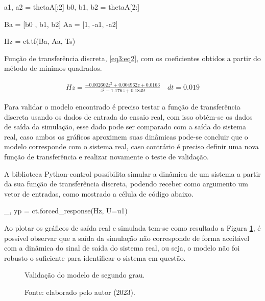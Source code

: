 \vspace{0.5cm}

\begin{python}
a1, a2 = thetaA[:2]
b0, b1, b2 = thetaA[2:]

Ba = [b0 , b1, b2]
Aa = [1, -a1, -a2]

Hz = ct.tf(Ba, Aa, Ts)
\end{python}

Função de transferência discreta, \ref{eq3:eq2}, com os coeficientes obtidos a partir do método de mínimos quadrados.

\begin{align}
Hz = \frac{-0.002602 z^2 + 0.004962 z + 0.0163}{z^2 - 1.176 z + 0.1849}\quad dt = 0.019\label{eq3:eq2}
\end{align}


Para validar o modelo encontrado é preciso testar a função de transferência discreta usando os dados de entrada do ensaio real, com isso obtém-se os dados de saída da simulação, esse dado pode ser comparado com a saída do sistema real, caso ambos os gráficos aproximem suas dinâmicas pode-se concluir que o modelo corresponde com o sistema real, caso contrário é preciso definir uma nova função de transferência e realizar novamente o teste de validação.

A biblioteca Python-control possibilita simular a dinâmica de um sistema a partir da sua função de transferência discreta, podendo receber como argumento um vetor de entradas, como mostrado a célula de código abaixo.

\vspace{0.5cm}

\begin{python}
_, yp = ct.forced_response(Hz, U=u1)
\end{python}

Ao plotar os gráficos de saída real e simulada tem-se como resultado a Figura \ref{fig3:image_21}, é possível observar que a saída da simulação não corresponde de forma aceitável com a dinâmica do sinal de saída do sistema real, ou seja, o modelo não foi robusto o suficiente para identificar o sistema em questão.

\begin{figure}[!h]
	\centering
	\caption{Validação do modelo de segundo grau.}
	\caption*{Fonte: elaborado pelo autor (2023).}
	\label{fig3:image_21}
\end{figure}


